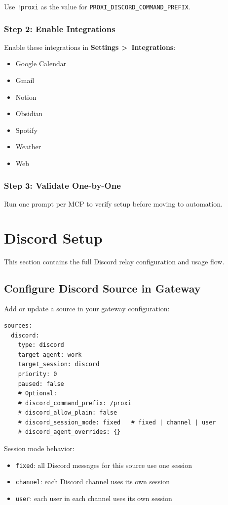 \documentclass{article}
\begin{document}
Use \texttt{!proxi} as the value for \texttt{PROXI\_DISCORD\_COMMAND\_PREFIX}.

\subsubsection{Step 2: Enable Integrations}
Enable these integrations in \textbf{Settings \textgreater\ Integrations}:
\begin{itemize}
	\item Google Calendar
	\item Gmail
	\item Notion
	\item Obsidian
	\item Spotify
	\item Weather
	\item Web
\end{itemize}

\subsubsection{Step 3: Validate One-by-One}
Run one prompt per MCP to verify setup before moving to automation.

\section{Discord Setup}

This section contains the full Discord relay configuration and usage flow.

\subsection{Configure Discord Source in Gateway}

Add or update a source in your gateway configuration:

\begin{verbatim}
sources:
  discord:
	type: discord
	target_agent: work
	target_session: discord
	priority: 0
	paused: false
	# Optional:
	# discord_command_prefix: /proxi
	# discord_allow_plain: false
	# discord_session_mode: fixed   # fixed | channel | user
	# discord_agent_overrides: {}
\end{verbatim}

Session mode behavior:
\begin{itemize}
	\item \texttt{fixed}: all Discord messages for this source use one session
	\item \texttt{channel}: each Discord channel uses its own session
	\item \texttt{user}: each user in each channel uses its own session
\end{itemize}
\end{document}
